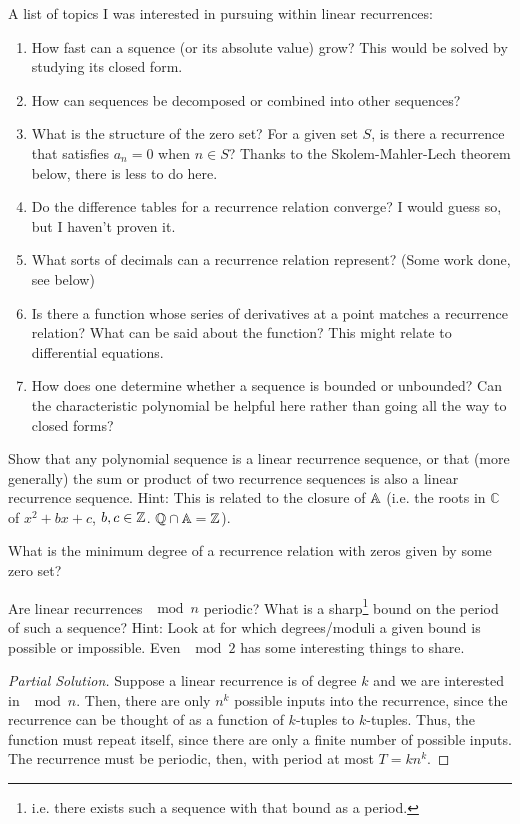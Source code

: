 A list of topics I was interested in pursuing within linear recurrences:
\begin{enumerate}
\item How fast can a squence (or its absolute value) grow? This would be solved by studying its closed form.
\item How can sequences be decomposed or combined into other sequences?
\item What is the structure of the zero set? For a given set $S$, is there a recurrence that satisfies $a_n = 0$ when $n\in S$? Thanks to the Skolem-Mahler-Lech theorem below, there is less to do here.
\item Do the difference tables for a recurrence relation converge? I would guess so, but I haven't proven it.
\item What sorts of decimals can a recurrence relation represent? (Some work done, see below)
\item Is there a function whose series of derivatives at a point matches a recurrence relation? What can be said about the function? This might relate to differential equations.
\item How does one determine whether a sequence is bounded or unbounded? Can the characteristic polynomial be helpful here rather than going all the way to closed forms?
\end{enumerate}
\begin{ex}
Show that any polynomial sequence is a linear recurrence sequence, or that (more generally) the sum or product of two recurrence sequences is also a linear recurrence sequence. Hint: This is related to the closure of $\mathbb{A}$ (i.e. the roots in $\mathbb{C}$ of $x^2+bx+c$, $b,c\in\mathbb{Z}$. $\mathbb{Q}\cap\mathbb{A} = \mathbb{Z}$).
\end{ex}
\begin{ex}
What is the minimum degree of a recurrence relation with zeros given by some zero set?
\end{ex}
\begin{ex}
Are linear recurrences $\mod n$ periodic? What is a sharp\footnote{i.e. there exists such a sequence with that bound as a period.} bound on the period of such a sequence? Hint: Look at for which degrees/moduli a given bound is possible or impossible. Even $\mod 2$ has some interesting things to share.
\begin{proof}[Partial Solution]
Suppose a linear recurrence is of degree $k$ and we are interested in $\mod{} n$. Then, there are only $n^k$ possible inputs into the recurrence, since the recurrence can be thought of as a function of $k$-tuples to $k$-tuples. Thus, the function must repeat itself, since there are only a finite number of possible inputs. The recurrence must be periodic, then, with period at most $T = kn^k$.
\end{proof}
\end{ex}

